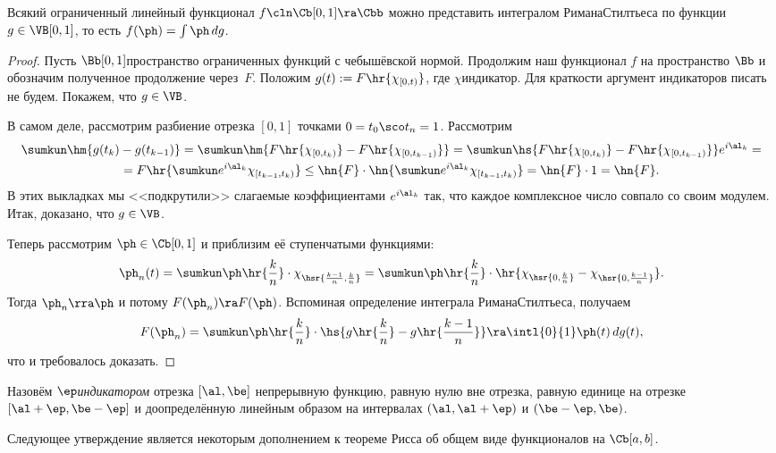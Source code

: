 \documentclass[a4paper]{article}
\begin{document}
\begin{theorem}[Ф. Рисса]
Всякий ограниченный линейный функционал $f\cln \Cb[0,1] \ra \Cbb$ можно представить интегралом Римана\ч Стилтьеса
по функции $g \in \VB[0,1]$, то есть $f(\ph) = \int \ph\,dg$.
\end{theorem}
\begin{proof}
Пусть $\Bb[0,1]$\т пространство ограниченных функций с чебышёвской нормой.
Продолжим наш функционал $f$ на пространство $\Bb$ и обозначим полученное продолжение
через~$F$. Положим $g(t) := F\hr{\chi_{[0,t)}}$, где $\chi$\т индикатор. Для краткости
аргумент индикаторов писать не будем.
Покажем, что $g \in \VB$.

В самом деле, рассмотрим разбиение отрезка $[0,1]$ точками $0=t_0\sco t_n=1$. Рассмотрим
\begin{multline*}
\sumkun \hm{g(t_k)-g(t_{k-1})} = \sumkun \hm{F\hr{\chi_{[0,t_k)}} - F \hr{\chi_{[0,t_{k-1})}}}=
\sumkun \hs{F\hr{\chi_{[0,t_k)}} - F\hr{\chi_{[0,t_{k-1})}}}e^{i\al_k} =\\=
F\hr{\sumkun e^{i\al_k} \chi_{[t_{k-1},t_k)}} \le
\hn{F} \cdot \hn{\sumkun e^{i\al_k} \chi_{[t_{k-1},t_k)}} = \hn{F}\cdot 1 = \hn{F}.
\end{multline*}
В этих выкладках мы <<подкрутили>> слагаемые коэффициентами $e^{i\al_k}$ так, что каждое комплексное число
совпало со своим модулем. Итак, доказано, что $g \in \VB$.

Теперь рассмотрим $\ph \in \Cb[0,1]$ и приблизим её ступенчатыми функциями:
$$\ph_n(t) = \sumkun \ph\hr{\frac kn}\cdot \chi_{\hsr{\frac{k-1}{n}, \frac kn}} =
             \sumkun \ph\hr{\frac kn}\cdot \hr{\chi_{\hsr{0, \frac kn}} -\chi_{\hsr{0, \frac{k-1}{n}}}}.$$
Тогда $\ph_n \rra \ph$ и потому $F(\ph_n) \ra F(\ph)$.
Вспоминая определение интеграла Римана\ч Стилтьеса, получаем
$$F(\ph_n) = \sumkun \ph\hr{\frac kn}\cdot \hs{g\hr{\frac kn} -g\hr{\frac{k-1}{n}}} \ra \intl{0}{1} \ph(t)\,d g(t),$$
что и требовалось доказать.
\end{proof}

\begin{df}
Назовём \emph{$\ep$\д индикатором} отрезка $[\al, \be]$ непрерывную функцию, равную нулю вне отрезка,
равную единице на отрезке $[\al + \ep, \be - \ep]$ и доопределённую линейным образом на интервалах
$(\al, \al + \ep)$ и $(\be - \ep,\be)$.
\end{df}


Следующее утверждение является некоторым дополнением к теореме Рисса об общем виде
функционалов на $\Cb[a,b]$.
\end{document}
